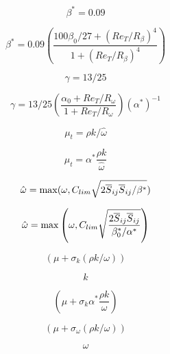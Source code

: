 

\begin{equation}
\beta^* = 0.09
\end{equation}

\begin{equation}
\beta^* = 0.09 \left( \frac{100 \beta_0 / 27 + (Re_T/R_{\beta})^4}
{1 + (Re_T/R_{\beta})^4} \right)
\end{equation}

\begin{equation}
\gamma = 13/25
\end{equation}

\begin{equation}
\gamma = 13/25 \left( \frac{\alpha_0 + Re_T/R_{\omega}}
{1 + Re_T/R_{\omega}} \right) (\alpha^*)^{-1}
\end{equation}

\begin{equation}
\mu_t = \rho k / \hat\omega
\end{equation}

\begin{equation}
\mu_t = \alpha^* \frac{\rho k}{\hat\omega}
\end{equation}

\begin{equation}
\hat\omega = {\rm max} (\omega, C_{lim} \sqrt{2 \overline S_{ij} \overline S_{ij} / \beta^*} )
\end{equation}

\begin{equation}
\hat\omega = {\rm max} \left(\omega, C_{lim} \sqrt{ \frac{2 \overline S_{ij} \overline S_{ij}}{\beta_0^*/\alpha^*}} \right)
\end{equation}

\begin{equation}
(\mu + \sigma_k (\rho k / \omega))
\end{equation}

\begin{equation}
k
\end{equation}

\begin{equation}
\left(\mu + \sigma_k \alpha^* \frac{\rho k}{\omega} \right)
\end{equation}

\begin{equation}
(\mu + \sigma_{\omega} (\rho k / \omega))
\end{equation}

\begin{equation}
\omega
\end{equation}

